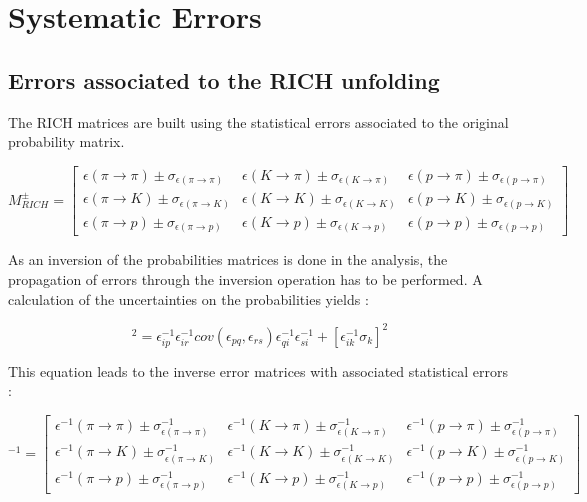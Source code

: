 \documentclass[letterpaper,12pt]{article}
\begin{document}
\section{Systematic Errors} \label{Sys}

\subsection{Errors associated to the RICH unfolding}

The RICH matrices are built using the statistical errors associated to the original probability matrix.

\begin{equation}
M^{\pm}_{RICH}
=
\begin{bmatrix}
\epsilon(\pi \rightarrow \pi)\pm\sigma_{\epsilon(\pi \rightarrow \pi)} & \epsilon(K \rightarrow \pi)\pm\sigma_{\epsilon(K \rightarrow \pi)} & \epsilon(p \rightarrow \pi)\pm\sigma_{\epsilon(p \rightarrow \pi)}\\
\epsilon(\pi \rightarrow K)\pm\sigma_{\epsilon(\pi \rightarrow K)} & \epsilon(K \rightarrow K)\pm\sigma_{\epsilon(K \rightarrow K)} & \epsilon(p \rightarrow K)\pm\sigma_{\epsilon(p \rightarrow K)} \\
\epsilon(\pi \rightarrow p)\pm\sigma_{\epsilon(\pi \rightarrow p)} & \epsilon(K \rightarrow p)\pm\sigma_{\epsilon(K \rightarrow p)} & \epsilon(p \rightarrow p)\pm\sigma_{\epsilon(p \rightarrow p)}
\end{bmatrix}
\end{equation}

As an inversion of the probabilities matrices is done in the analysis, the propagation of errors through the
inversion operation has to be performed. A calculation of the uncertainties on the probabilities yields \cite{} :

\begin{equation}
  [\sigma^{-1}_i]^2 = \epsilon^{-1}_{ip}\epsilon^{-1}_{ir}cov(\epsilon_{pq},\epsilon_{rs})\epsilon^{-1}_{qi}\epsilon^{-1}_{si} + [\epsilon^{-1}_{ik}\sigma_k]^2
\end{equation}

This equation leads to the inverse error matrices with associated statistical errors :

\begin{equation}
[M^{\pm}_{RICH}]^{-1}
=
\begin{bmatrix}
\epsilon^{-1}(\pi \rightarrow \pi)\pm\sigma^{-1}_{\epsilon(\pi \rightarrow \pi)} & \epsilon^{-1}(K \rightarrow \pi)\pm\sigma^{-1}_{\epsilon(K \rightarrow \pi)} & \epsilon^{-1}(p \rightarrow \pi)\pm\sigma^{-1}_{\epsilon(p \rightarrow \pi)}\\
\epsilon^{-1}(\pi \rightarrow K)\pm\sigma^{-1}_{\epsilon(\pi \rightarrow K)} & \epsilon^{-1}(K \rightarrow K)\pm\sigma^{-1}_{\epsilon(K \rightarrow K)} & \epsilon^{-1}(p \rightarrow K)\pm\sigma^{-1}_{\epsilon(p \rightarrow K)} \\
\epsilon^{-1}(\pi \rightarrow p)\pm\sigma^{-1}_{\epsilon(\pi \rightarrow p)} & \epsilon^{-1}(K \rightarrow p)\pm\sigma^{-1}_{\epsilon(K \rightarrow p)} & \epsilon^{-1}(p \rightarrow p)\pm\sigma^{-1}_{\epsilon(p \rightarrow p)}
\end{bmatrix}
\end{equation}
\end{document}
